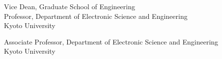 
{Vice Dean, Graduate School of Engineering 
\\ Professor, Department of Electronic Science and Engineering
\\Kyoto University}

\divider

{Associate Professor, Department of Electronic Science and Engineering
\\Kyoto University}
